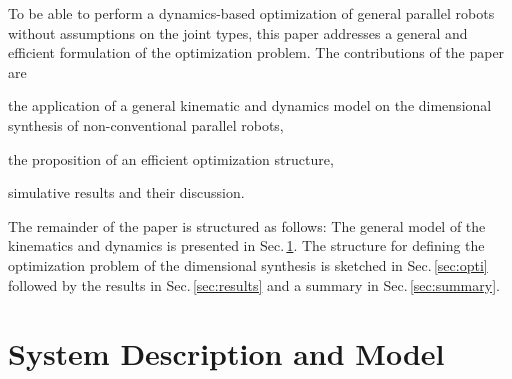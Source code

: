 \documentclass[fleqn,a4paper,10pt]{article}
\newcommand{\bm}[1]{\mathbf{#1}}
\renewcommand{\Phi}[1]{\varPhi{#1}}
\begin{document}
\begin{multicols}{2}
To be able to perform a dynamics-based optimization of general parallel robots without assumptions on the joint types, this paper addresses a general and efficient formulation of the optimization problem.
%
The contributions of the paper are
\begin{compactitem}
\item the application of a general kinematic and dynamics model on the dimensional synthesis of non-conventional parallel robots,
\item the proposition of an efficient optimization structure,
\item simulative results and their discussion.
\end{compactitem}

The remainder of the paper is structured as follows: The general model of the kinematics and dynamics is presented in Sec.\,\ref{sec:sysmdl}.
The structure for defining the optimization problem of the dimensional synthesis is sketched in Sec.\,\ref{sec:opti} followed by the results in Sec.\,\ref{sec:results} and a summary in Sec.\,\ref{sec:summary}.

\section{System Description and Model}
\label{sec:sysmdl}







\end{multicols}
\end{document}
